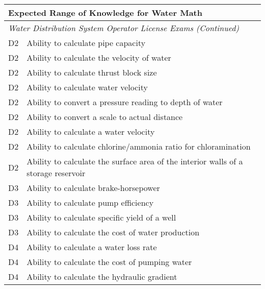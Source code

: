 \begin{table}[H]
\begin{tabular}{| m{1cm} |m{15cm} |}
\hline
\multicolumn{2}{|l|}{\textbf{Expected   Range of Knowledge for Water Math}}                                                                      \\ \hline
\multicolumn{2}{|l|}{\textit{Water   Distribution System Operator License Exams (Continued)}}                                                                  \\ \hline
D2 & Ability to calculate   pipe capacity                                         \\ \hline
D2 & Ability to calculate   the velocity of water                                 \\ \hline
D2 & Ability to calculate   thrust block size                                     \\ \hline
D2 & Ability to calculate   water velocity                                        \\ \hline
D2 & Ability to convert a   pressure reading to depth of water                    \\ \hline
D2 & Ability to convert a   scale to actual distance                              \\ \hline
D2 & Ability to calculate a water velocity                                        \\ \hline
D2 & Ability to calculate   chlorine/ammonia ratio for chloramination                     \\ \hline
D2 & Ability to calculate   the surface area of the interior walls of a storage reservoir \\ \hline
D3 & Ability to calculate   brake-horsepower                                      \\ \hline
D3 & Ability to calculate   pump efficiency                                       \\ \hline
D3 & Ability to calculate   specific yield of a well                              \\ \hline
D3 & Ability to calculate   the cost of water production                          \\ \hline
D4 & Ability to calculate a water loss rate                                       \\ \hline
D4 & Ability to calculate the cost of pumping   water                             \\ \hline
D4 & Ability to calculate the hydraulic gradient                                  \\ \hline

\end{tabular}
\end{table}
